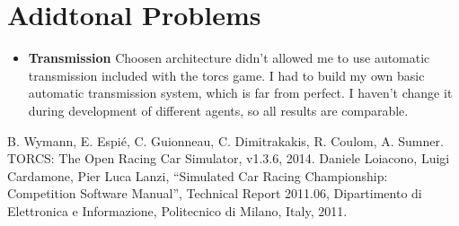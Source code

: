 \documentclass[declaration,shortabstract,english,inz]{iithesis}
\begin{document}
\chapter{Adidtonal Problems}

\begin{itemize}
    \item \textbf{Transmission} Choosen architecture didn't allowed me to use automatic transmission included with the torcs game. I had to build my own basic automatic transmission system, which is far from perfect. I haven't change it during development of different agents, so all results are comparable. 
\end{itemize}



\begin{thebibliography}{1}
 B. Wymann, E. Espié, C. Guionneau, C. Dimitrakakis, R. Coulom, A. Sumner. TORCS: The Open Racing Car Simulator, v1.3.6, 2014.
 Daniele Loiacono, Luigi Cardamone, Pier Luca Lanzi, “Simulated Car
Racing Championship: Competition Software Manual”, Technical Report 2011.06, Dipartimento
di Elettronica e Informazione, Politecnico di Milano, Italy, 2011.
\end{thebibliography}
\end{document}
